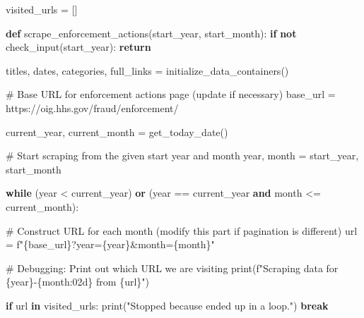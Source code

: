 \documentclass[
  letterpaper,
  DIV=11,
  numbers=noendperiod]{scrartcl}
\newenvironment{Shaded}{\begin{snugshade}}{\end{snugshade}}
\newcommand{\BuiltInTok}[1]{\textcolor[rgb]{0.00,0.23,0.31}{#1}}
\newcommand{\CommentTok}[1]{\textcolor[rgb]{0.37,0.37,0.37}{#1}}
\newcommand{\ControlFlowTok}[1]{\textcolor[rgb]{0.00,0.23,0.31}{\textbf{#1}}}
\newcommand{\KeywordTok}[1]{\textcolor[rgb]{0.00,0.23,0.31}{\textbf{#1}}}
\newcommand{\NormalTok}[1]{\textcolor[rgb]{0.00,0.23,0.31}{#1}}
\newcommand{\OperatorTok}[1]{\textcolor[rgb]{0.37,0.37,0.37}{#1}}
\newcommand{\SpecialCharTok}[1]{\textcolor[rgb]{0.37,0.37,0.37}{#1}}
\newcommand{\SpecialStringTok}[1]{\textcolor[rgb]{0.13,0.47,0.30}{#1}}
\newcommand{\StringTok}[1]{\textcolor[rgb]{0.13,0.47,0.30}{#1}}
\begin{document}
\begin{Shaded}
\begin{Highlighting}[]
\NormalTok{visited\_urls }\OperatorTok{=}\NormalTok{ []}

\KeywordTok{def}\NormalTok{ scrape\_enforcement\_actions(start\_year, start\_month):}
    \ControlFlowTok{if} \KeywordTok{not}\NormalTok{ check\_input(start\_year):}
        \ControlFlowTok{return}

\NormalTok{    titles, dates, categories, full\_links }\OperatorTok{=}\NormalTok{ initialize\_data\_containers()}
    
    \CommentTok{\# Base URL for enforcement actions page (update if necessary)}
\NormalTok{    base\_url }\OperatorTok{=} \StringTok{\textquotesingle{}https://oig.hhs.gov/fraud/enforcement/\textquotesingle{}}
    
\NormalTok{    current\_year, current\_month }\OperatorTok{=}\NormalTok{ get\_today\_date()}
    
    
    \CommentTok{\# Start scraping from the given start year and month}
\NormalTok{    year, month }\OperatorTok{=}\NormalTok{ start\_year, start\_month}
    
    \ControlFlowTok{while}\NormalTok{ (year }\OperatorTok{\textless{}}\NormalTok{ current\_year) }\KeywordTok{or}\NormalTok{ (year }\OperatorTok{==}\NormalTok{ current\_year }\KeywordTok{and}\NormalTok{ month }\OperatorTok{\textless{}=}\NormalTok{ current\_month):}
        
        \CommentTok{\# Construct URL for each month (modify this part if pagination is different)}
\NormalTok{        url }\OperatorTok{=} \SpecialStringTok{f"}\SpecialCharTok{\{}\NormalTok{base\_url}\SpecialCharTok{\}}\SpecialStringTok{?year=}\SpecialCharTok{\{}\NormalTok{year}\SpecialCharTok{\}}\SpecialStringTok{\&month=}\SpecialCharTok{\{}\NormalTok{month}\SpecialCharTok{\}}\SpecialStringTok{"}
        
        \CommentTok{\# Debugging: Print out which URL we are visiting}
        \BuiltInTok{print}\NormalTok{(}\SpecialStringTok{f"Scraping data for }\SpecialCharTok{\{}\NormalTok{year}\SpecialCharTok{\}}\SpecialStringTok{{-}}\SpecialCharTok{\{}\NormalTok{month}\SpecialCharTok{:02d\}}\SpecialStringTok{ from }\SpecialCharTok{\{}\NormalTok{url}\SpecialCharTok{\}}\SpecialStringTok{"}\NormalTok{)}
        
        \ControlFlowTok{if}\NormalTok{ url }\KeywordTok{in}\NormalTok{ visited\_urls:}
            \BuiltInTok{print}\NormalTok{(}\StringTok{"Stopped because ended up in a loop."}\NormalTok{)}
            \ControlFlowTok{break}


\end{Highlighting}
\end{Shaded}
\end{document}
